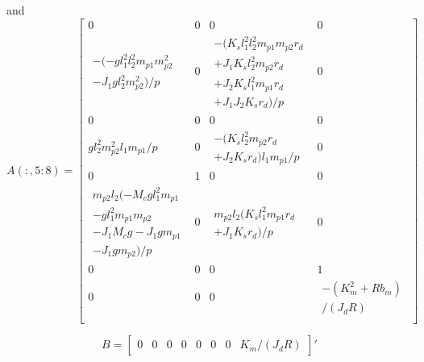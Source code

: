 \documentclass{article}
\begin{document}
and
\begin{equation*}
A(:,5:8) = \begin{bmatrix}
0 & 0 & 0 & 0 \\

\begin{split}
-(-g l_1^2 l_2^2 m_{p1} m_{p2}^2 \\ -J_1 g l_2^2 m_{p2}^2)/p
\end{split}
&
0
&
\begin{split}
-(K_s l_1^2 l_2^2 m_{p1} m_{p2} r_d \\ +J_1 K_s l_2^2 m_{p2} r_d \\ +J_2 K_s l_1^2 m_{p1} r_d \\ +J_1 J_2 K_s r_d)/p
\end{split}
&
0 \\

0 & 0 & 0 & 0 \\

g l_2^2 m_{p2}^2 l_1 m_{p1}/p
&
0
&
\begin{split}
-(K_s l_2^2 m_{p2} r_d \\ +J_2 K_s r_d) l_1 m_{p1}/p
\end{split}
&
0 \\

0 & 1 & 0 & 0 \\

\begin{split}
m_{p2} l_2 (-M_c g l_1^2 m_{p1} \\ -g l_1^2 m_{p1} m_{p2} \\ -J_1 M_c g-J_1 g m_{p1} \\ -J_1 g m_{p2})/p
\end{split}
&
0
&
\begin{split}
m_{p2} l_2 (K_s l_1^2 m_{p1} r_d \\ +J_1 K_s r_d)/p
\end{split}
&
0 \\

0 & 0 & 0 & 1 \\

0 & 0 & 0 &
\begin{split}
-(K_m^2+ R b_m) \\ /(J_d R)
\end{split} \\
\end{bmatrix}
\end{equation*}

\begin{equation*}
B =  \begin{bmatrix}
0 & 0 & 0 & 0 & 0 & 0 & 0 & K_m/(J_d R)
\end{bmatrix} '
\end{equation*}
\end{document}

